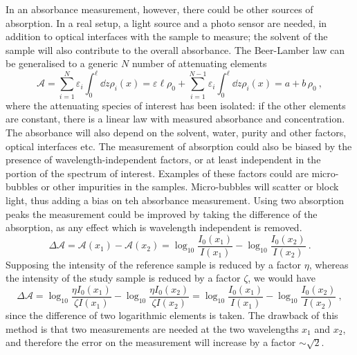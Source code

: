In an absorbance measurement, however, there could be other sources of absorption.
In a real setup, a light source and a photo sensor are needed, in addition to optical interfaces with the %
sample to measure; the solvent of the sample will also contribute to the overall absorbance.
The Beer-Lamber law can be generalised to a generic $N$ number of attenuating elements
\begin{equation}
	\mathcal{A} = \sum_{i = 1}^N \varepsilon_i \int_0^\ell \dd{z} \rho_i (x) = %
	\varepsilon \ell \rho_0 +  \sum_{i = 1}^{N-1} \varepsilon_i \int_0^\ell \dd{z} \rho_i (x) = a + b \, \rho_0\ ,
\end{equation}
where the attenuating species of interest has been isolated: %
if the other elements are constant, there is a linear law with measured absorbance and concentration.
The absorbance will also depend on the solvent, \ie water, purity and other factors, \eg optical interfaces etc.
The measurement of absorption could also be biased by the presence of wavelength-independent factors, %
or at least independent in the portion of the spectrum of interest.
Examples of these factors could are micro-bubbles or other impurities in the samples.
Micro-bubbles will scatter or block light, thus adding a bias on teh absorbance measurement.
Using two absorption peaks the measurement could be improved by taking the difference of the absorption, %
as any effect which is wavelength independent is removed.
\begin{equation}
	\Delta \mathcal{A} = \mathcal{A}(x_1) - \mathcal{A}(x_2) = %
	\log_{10} \frac{I_0 (x_1)}{I(x_1)} - \log_{10} \frac{I_0 (x_2)}{I(x_2)}\ .
\end{equation}
Supposing the intensity of the reference sample is reduced by a factor $\eta$, %
whereas the intensity of the study sample is reduced by a factor $\zeta$, we would have
\begin{equation}
	\Delta \mathcal{A} = %
	\log_{10} \frac{\eta I_0 (x_1)}{\zeta I(x_1)} - \log_{10} \frac{\eta I_0 (x_2)}{\zeta I(x_2)} = %
	\log_{10} \frac{I_0 (x_1)}{I(x_1)} - \log_{10} \frac{I_0 (x_2)}{I(x_2)}\ ,
\end{equation}
since the difference of two logarithmic elements is taken.
The drawback of this method is that two measurements are needed at the two wavelengths $x_1$ and $x_2$, %
and therefore the error on the measurement will increase by a factor $\sim \sqrt{2}$.

